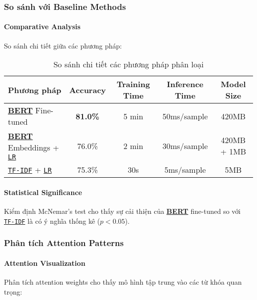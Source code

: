     \subsubsection{So sánh với Baseline Methods}
    
    \paragraph{Comparative Analysis}
    So sánh chi tiết giữa các phương pháp:
    
    \begin{table}[H]
    \centering
    \caption{So sánh chi tiết các phương pháp phân loại}
    \label{tab:detailed_comparison}
    \begin{tabular}{lcccc}
    \toprule
    \textbf{Phương pháp} & \textbf{Accuracy} & \textbf{Training Time} & \textbf{Inference Time} & \textbf{Model Size} \\
    \midrule
    \hyperref[acro:bert]{\textbf{BERT}} Fine-tuned & \textbf{81.0\%} & 5 min & 50ms/sample & 420MB \\
    \hyperref[acro:bert]{\textbf{BERT}} Embeddings + \hyperref[acro:lr]{\texttt{LR}} & 76.0\% & 2 min & 30ms/sample & 420MB + 1MB \\
    \hyperref[acro:tfidf]{\texttt{TF-IDF}} + \hyperref[acro:lr]{\texttt{LR}} & 75.3\% & 30s & 5ms/sample & 5MB \\
    \bottomrule
    \end{tabular}
    \end{table}
    
    \paragraph{Statistical Significance}
    Kiểm định McNemar's test cho thấy sự cải thiện của \hyperref[acro:bert]{\textbf{BERT}} fine-tuned so với \hyperref[acro:tfidf]{\texttt{TF-IDF}} là có ý nghĩa
    thống kê ($p < 0.05$).
    
    \subsubsection{Phân tích Attention Patterns}
    
    \paragraph{Attention Visualization}
    Phân tích attention weights cho thấy mô hình tập trung vào các từ khóa quan trọng:
    
